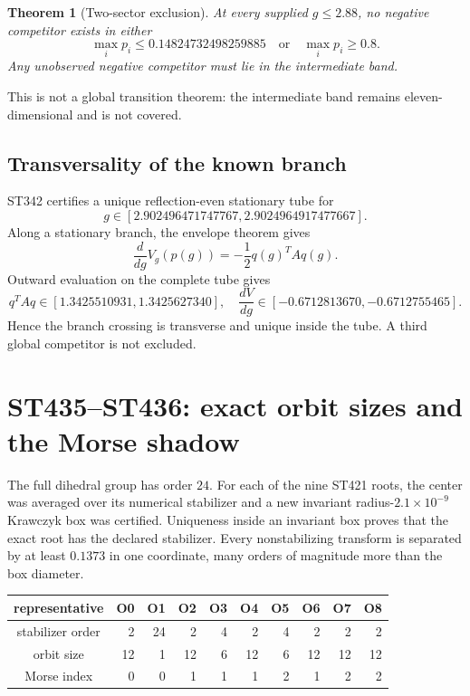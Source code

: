 \documentclass[11pt,a4paper]{article}
\newtheorem{theorem}{Theorem}
\begin{document}
\begin{theorem}[Two-sector exclusion]
At every supplied $g\le2.88$, no negative competitor exists in either
\[
 \max_i p_i\le0.14824732498259885
 \quad\text{or}\quad
 \max_i p_i\ge0.8.
\]
Any unobserved negative competitor must lie in the intermediate band.
\end{theorem}

This is not a global transition theorem: the intermediate band remains
eleven-dimensional and is not covered.

\subsection{Transversality of the known branch}

ST342 certifies a unique reflection-even stationary tube for
\[
 g\in[2.902496471747767,2.9024964917477667].
\]
Along a stationary branch, the envelope theorem gives
\[
 \frac{d}{dg}V_g(p(g))=-\frac12q(g)^TAq(g).
\]
Outward evaluation on the complete tube gives
\[
 q^TAq\in[1.3425510931,1.3425627340],
 \quad
 \frac{dV}{dg}\in[-0.6712813670,-0.6712755465].
\]
Hence the branch crossing is transverse and unique inside the tube.  A third
global competitor is not excluded.

\section{ST435--ST436: exact orbit sizes and the Morse shadow}

The full dihedral group has order $24$.  For each of the nine ST421 roots,
the center was averaged over its numerical stabilizer and a new invariant
radius-$2.1\times10^{-9}$ Krawczyk box was certified.  Uniqueness inside an
invariant box proves that the exact root has the declared stabilizer.  Every
nonstabilizing transform is separated by at least $0.1373$ in one coordinate,
many orders of magnitude more than the box diameter.

\begin{center}
\begin{tabular}{c|rrrrrrrrr}
\toprule representative&O0&O1&O2&O3&O4&O5&O6&O7&O8\\\midrule
stabilizer order&2&24&2&4&2&4&2&2&2\\
orbit size&12&1&12&6&12&6&12&12&12\\
Morse index&0&0&1&1&1&2&1&2&2\\\bottomrule
\end{tabular}
\end{center}
\end{document}
